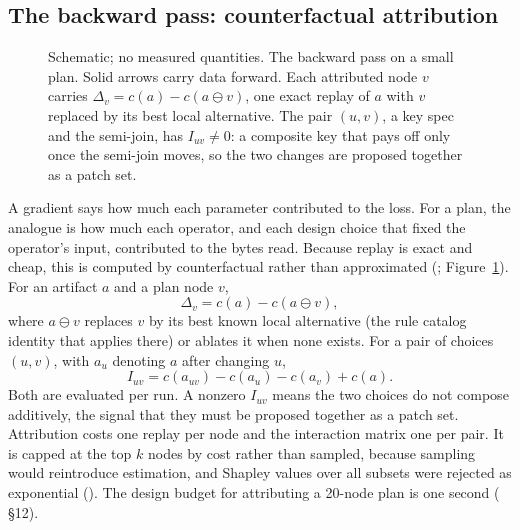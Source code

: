 \subsection{The backward pass: counterfactual attribution}\label{sec:attribution}

\begin{figure}[t]
  \centering
  
  \caption{Schematic; no measured quantities. The backward pass on a small
    plan. Solid arrows carry data forward. Each attributed node $v$ carries
    $\Delta_v = c(a) - c(a \ominus v)$, one exact replay of $a$ with $v$
    replaced by its best local alternative. The pair $(u, v)$, a key spec and
    the semi-join, has $I_{uv} \neq 0$: a composite key that pays off only
    once the semi-join moves, so the two changes are proposed together as a
    patch set.}
  \label{fig:schematic-backward}
\end{figure}

A gradient says how much each parameter contributed to the loss. For a plan,
the analogue is how much each operator, and each design choice that fixed the
operator's input, contributed to the bytes read. Because replay is exact and
cheap, this is computed by counterfactual rather than approximated
(; Figure~\ref{fig:schematic-backward}). For an artifact $a$ and a
plan node $v$,
\begin{equation}\label{eq:attr}
  \Delta_v = c(a) - c(a \ominus v),
\end{equation}
where $a \ominus v$ replaces $v$ by its best known local alternative (the rule
catalog identity that applies there) or ablates it when none exists. For a pair
of choices $(u, v)$, with $a_u$ denoting $a$ after changing $u$,
\begin{equation}\label{eq:interaction}
  I_{uv} = c(a_{uv}) - c(a_u) - c(a_v) + c(a).
\end{equation}
Both are evaluated per run. A nonzero $I_{uv}$ means the two choices do not
compose additively, the signal that they must be proposed together as a patch
set. Attribution costs one replay per node and the interaction matrix one per
pair. It is capped at the top $k$ nodes by cost rather than sampled, because
sampling would reintroduce estimation, and Shapley values over all subsets were
rejected as exponential (). The design budget for attributing a
20-node plan is one second ( \S12).

